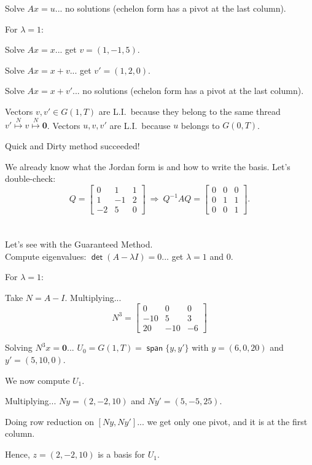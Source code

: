 \documentclass[11pt]{article}
\newcommand{\1}{\mathbf{1}}
\newcommand{\0}{\mathbf{0}}
\DeclareMathOperator{\myspan}{\mathsf{span}}
\DeclareMathOperator{\mydet}{\mathsf{det}}
\theoremstyle{definition}
\begin{document}
Solve $Ax=u$...
no solutions (echelon form has a pivot at the last column).

For $\lambda=1$:

Solve $Ax=x$... get $ v=(1,-1,5) $.

Solve $Ax=x+v$... get $ v'= (1,2,0) $.

Solve $Ax=x+v'$...
no solutions (echelon form has a pivot at the last column).

Vectors $v,v' \in G(1,T)$ are L.I.\ because they belong to the same thread $v' \stackrel{N}{\mapsto} v \stackrel{N}{\mapsto} \0$.
Vectors $u,v,v'$ are L.I.\ because $u$ belongs to $G(0,T)$.

Quick and Dirty method succeeded!

We already know what the Jordan form is and how to write the basis.
Let's double-check:
\[
Q=
\begin{bmatrix}
0 & 1 & 1 \\
1 & -1 & 2 \\
-2 & 5 & 0
\end{bmatrix}
\
\Longrightarrow
\
Q^{-1}AQ = 
\left[
\begin{array}{r|rr}
0 & 0 & 0 \\
\hline
0 & 1 & 1 \\
0 & 0 & 1
\end{array}
\right]
.
\]
\\
\\

Let's see with the Guaranteed Method.
\\

Compute eigenvalues: $ \mydet(A-\lambda I)=0 $... get $\lambda=1$ and $0$.

For $\lambda=1$:

Take $N=A-I$.
Multiplying...
\[
N^3 =
\begin{bmatrix}
0 & 0 & 0 \\
-10 & 5 & 3 \\
20 & -10 & -6
\end{bmatrix}
\]

Solving $N^3 x = \0$... $U_0 = G(1,T)=\myspan \{y,y'\}$ with $y=(6,0,20)$ and $y'=(5,10,0)$.

We now compute $U_1$.

Multiplying... $Ny = (2,-2,10)$ and $Ny' = (5,-5,25)$.

Doing row reduction on $ [Ny, Ny'] $... we get only one pivot, and it is at the first column.

Hence, $z = (2,-2,10)$ is a basis for $U_1$.
\end{document}
